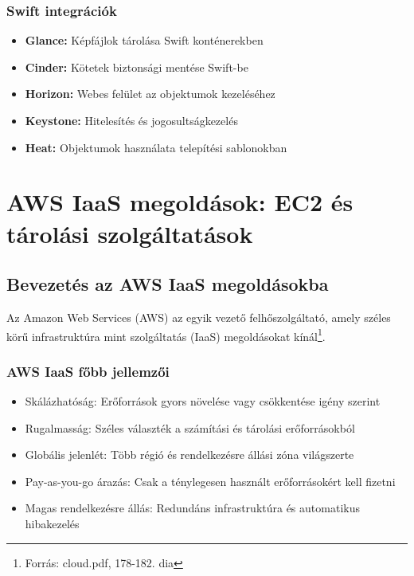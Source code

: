 \documentclass[a4paper,12pt]{article}
\begin{document}
    \subsubsection{Swift integrációk}

    \begin{itemize}
        \item \textbf{Glance:} Képfájlok tárolása Swift konténerekben
        \item \textbf{Cinder:} Kötetek biztonsági mentése Swift-be
        \item \textbf{Horizon:} Webes felület az objektumok kezeléséhez
        \item \textbf{Keystone:} Hitelesítés és jogosultságkezelés
        \item \textbf{Heat:} Objektumok használata telepítési sablonokban
    \end{itemize}

    \newpage


    \section{AWS IaaS megoldások: EC2 és tárolási szolgáltatások}

    \subsection{Bevezetés az AWS IaaS megoldásokba}

    Az Amazon Web Services (AWS) az egyik vezető felhőszolgáltató, amely széles körű infrastruktúra mint szolgáltatás (IaaS) megoldásokat kínál\footnote{Forrás: cloud.pdf, 178-182. dia}.

    \subsubsection{AWS IaaS főbb jellemzői}

    \begin{itemize}
        \item Skálázhatóság: Erőforrások gyors növelése vagy csökkentése igény szerint
        \item Rugalmasság: Széles választék a számítási és tárolási erőforrásokból
        \item Globális jelenlét: Több régió és rendelkezésre állási zóna világszerte
        \item Pay-as-you-go árazás: Csak a ténylegesen használt erőforrásokért kell fizetni
        \item Magas rendelkezésre állás: Redundáns infrastruktúra és automatikus hibakezelés
    \end{itemize}
\end{document}
